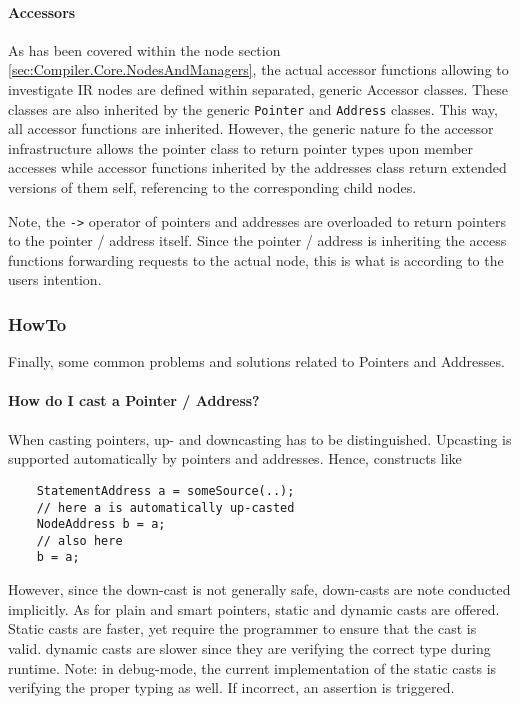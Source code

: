 \paragraph{Accessors}
As has been covered within the node section
\ref{sec:Compiler.Core.NodesAndManagers}, the actual accessor functions allowing
to investigate IR nodes are defined within separated, generic Accessor classes.
These classes are also inherited by the generic \texttt{Pointer} and
\texttt{Address} classes. This way, all accessor functions are inherited.
However, the generic nature fo the accessor infrastructure allows the pointer
class to return pointer types upon member accesses while accessor functions
inherited by the addresses class return extended versions of them self,
referencing to the corresponding child nodes.

Note, the \lstinline|->| operator of pointers and addresses are overloaded to
return pointers to the pointer / address itself. Since the pointer / address is
inheriting the access functions forwarding requests to the actual node, this is
what is according to the users intention.

\subsubsection{HowTo}
Finally, some common problems and solutions related to Pointers and Addresses.

\paragraph{How do I cast a Pointer / Address?}
When casting pointers, up- and downcasting has to be distinguished. Upcasting is
supported automatically by pointers and addresses. Hence, constructs like
\begin{lstlisting}
	StatementAddress a = someSource(..);
	// here a is automatically up-casted
	NodeAddress b = a;
	// also here
	b = a;
\end{lstlisting}

However, since the down-cast is not generally safe, down-casts are note
conducted implicitly. As for plain and smart pointers, static and dynamic casts
are offered. Static casts are faster, yet require the programmer to ensure that
the cast is valid. dynamic casts are slower since they are verifying the correct
type during runtime. Note: in debug-mode, the current implementation of the
static casts is verifying the proper typing as well. If incorrect, an assertion
is triggered.

